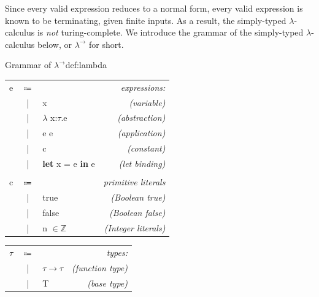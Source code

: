 Since every valid expression reduces to a normal form, every valid expression is known to be terminating, given finite inputs.
As a result, the simply-typed $\lambda$-calculus is \textit{not} turing-complete.
We introduce the grammar of the simply-typed $\lambda$-calculus below, or $\lambda^\rightarrow$ for short.

\begin{definitiontitled}{Grammar of $\lambda^{\rightarrow}$}{def:lambda}
\begin{changemargin}{-0.5cm}{0cm}
\begin{minipage}[b]{0.50\linewidth}
\begin{tabular}{lclr}
e       & $\Coloneqq$ &                             & \textit{expressions:} \\
        & |    & x                                 & \textit{(variable)} \\
        & |    & $\lambda$ x:$\tau$.e              & \textit{(abstraction)} \\
        & |    & e e                               & \textit{(application)} \\
        & |    & c                                 & \textit{(constant)} \\
        & |    & \textbf{let} x = e \textbf{in} e  & \textit{(let binding)} \\
\\
c       & $\Coloneqq$ &                             & \textit{primitive literals} \\
        & |    & true                              & \textit{(Boolean true)} \\
        & |    & false                             & \textit{(Boolean false)} \\
        & |    & n $\in \mathbb{Z}$                & \textit{(Integer literals)} \\
\end{tabular}
\end{minipage}
\begin{minipage}[b]{0.40\linewidth}
\begin{tabular}{lclr}
$\tau$  & $\Coloneqq$ &                             & \textit{types:} \\
        & |     & $\tau \rightarrow \tau$          & \textit{(function type)} \\
        & |     & T                                & \textit{(base type)} \\

\end{tabular}
\end{minipage}
\end{changemargin}
\end{definitiontitled}
